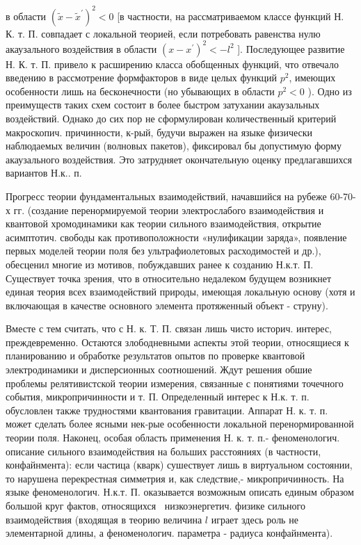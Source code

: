 \documentclass[10pt]{article}
\begin{document}
в области $\left(\tilde{x}-\tilde{x}^{\prime}\right)^{2}<0$ [в частности, на рассматриваемом классе функций Н. К. т. П. совпадает с локальной теорией, если потребовать равенства нулю акаузального воздействия в области $\left(x-x^{\prime}\right)^{2}<-l^{2}$ ]. Последующее развитие Н. К. т. П. привело к расширению класса обобщенных функций, что отвечало введению в рассмотрение формфакторов в виде целых функций $p^{2}$, имеющих особенности лишь на бесконечности (но убывающих в области $p^{2}<0$ ). Одно из преимуществ таких схем состоит в более быстром затухании акаузальных воздействий. Однако до сих пор не сформулирован количественный критерий макроскопич. причинности, к-рый, будучи выражен на языке физически наблюдаемых величин (волновых пакетов), фиксировал бы допустимую форму акаузального воздействия. Это затрудняет окончательную оценку предлагавшихся вариантов Н.к.. п.



Прогресс теории фундаментальных взаимодействий, начавшийся на рубеже 60-70-х гг. (создание перенормируемой теории электрослабого взаимодействия и квантовой хромодинамики как теории сильного взаимодействия, открытие асимптотич. свободы как противоположности «нулификации заряда», появление первых моделей теории поля без ультрафиолетовых расходимостей и др.), обесценил многие из мотивов, побуждавших ранее к созданию Н.к.т. П. Существует точка зрения, что в относительно недалеком будущем возникнет единая теория всех взаимодействий природы, имеющая локальную основу (хотя и включающая в качестве основного элемента протяженный объект - струну).



Вместе с тем считать, что с Н. к. Т. П. связан лишь чисто историч. интерес, преждевременно. Остаются злободневными аспекты этой теории, относящиеся к планированию и обработке результатов опытов по проверке квантовой электродинамики и дисперсионных соотношений. Ждут решения обшие проблемы релятивистской теории измерения, связанные с понятиями точечного события, микропричинности и т. П. Определенный интерес к Н.к. т. п. обусловлен также трудностями квантования гравитации. Аппарат Н. к. т. п. может сделать более ясными нек-рые особенности локальной перенормированной теории поля. Наконец, особая область применения Н. к. т. п.- феноменологич. описание сильного взаимодействия на больших расстояниях (в частности, конфайнмента): если частица (кварк) сушествует лишь в виртуальном состоянии, то нарушена перекрестная симметрия и, как следствие,- микропричинность. На языке феноменологич. Н.к.т. П. оказывается возможным описать единым образом большой круг фактов, относящихся $\mathbf{~}$ низкоэнергетич. физике сильного взаимодействия (входящая в теорию величина $l$ играет здесь роль не элементарной длины, а феноменологич. параметра - радиуса конфайнмента).
\end{document}
